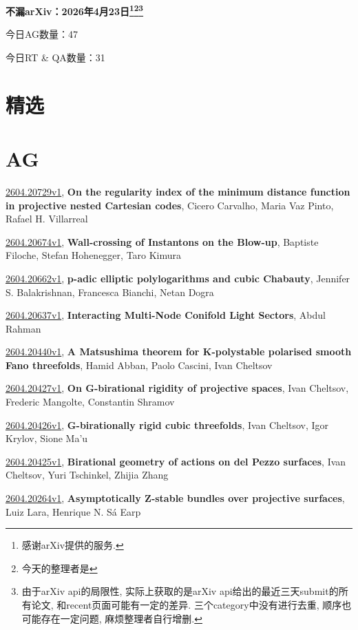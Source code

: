 \documentclass[9pt, a4paper]{article}
\theoremstyle{plain}
\theoremstyle{definition}
\theoremstyle{remark}
\newcommand{\arxiv}[3]{\href{https://arxiv.org/abs/#1}{#1}, \textbf{\textcolor{arxivblue}{#2}}, #3}
\newcommand{\AGnumber}{47}
\newcommand{\RTQAnumber}{31}
\newcommand{\NewestDate}{2026年4月23日}
\newcommand{\todayarXiver}{} %
\begin{document}
\begin{center}
    \Huge\textbf{不漏arXiv：\NewestDate\footnote{感谢arXiv提供的服务.}\footnote{今天的整理者是\todayarXiver}\footnote{由于arXiv api的局限性, 实际上获取的是arXiv api给出的最近三天submit的所有论文, 和recent页面可能有一定的差异. 三个category中没有进行去重, 顺序也可能存在一定问题, 麻烦整理者自行增删.}} \\
\end{center}

\setcounter{section}{-1}

\begin{center}
    今日AG数量：\AGnumber
    
    今日RT \& QA数量：\RTQAnumber
    
\end{center}


\section{精选}


\section{AG}
\arxiv{2604.20729v1}{On the regularity index of the minimum distance function in projective nested Cartesian codes}{Cicero Carvalho, Maria Vaz Pinto, Rafael H. Villarreal}

\arxiv{2604.20674v1}{Wall-crossing of Instantons on the Blow-up}{Baptiste Filoche, Stefan Hohenegger, Taro Kimura}

\arxiv{2604.20662v1}{p-adic elliptic polylogarithms and cubic Chabauty}{Jennifer S. Balakrishnan, Francesca Bianchi, Netan Dogra}

\arxiv{2604.20637v1}{Interacting Multi-Node Conifold Light Sectors}{Abdul Rahman}

\arxiv{2604.20440v1}{A Matsushima theorem for K-polystable polarised smooth Fano threefolds}{Hamid Abban, Paolo Cascini, Ivan Cheltsov}

\arxiv{2604.20427v1}{On G-birational rigidity of projective spaces}{Ivan Cheltsov, Frederic Mangolte, Constantin Shramov}

\arxiv{2604.20426v1}{G-birationally rigid cubic threefolds}{Ivan Cheltsov, Igor Krylov, Sione Ma'u}

\arxiv{2604.20425v1}{Birational geometry of actions on del Pezzo surfaces}{Ivan Cheltsov, Yuri Tschinkel, Zhijia Zhang}

\arxiv{2604.20264v1}{Asymptotically Z-stable bundles over projective surfaces}{Luiz Lara, Henrique N. Sá Earp}
\end{document}
